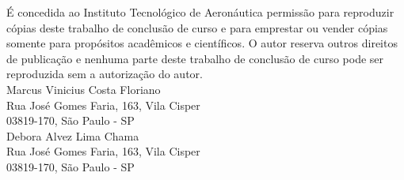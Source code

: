 \begin{titlepage}
\normalfont \normalsize É concedida ao Instituto Tecnológico de Aeronáutica permissão para reproduzir cópias deste trabalho de conclusão de curso e para emprestar ou vender cópias somente para propósitos acadêmicos e científicos. O autor reserva outros direitos de publicação e nenhuma parte deste trabalho de conclusão de curso pode ser reproduzida sem a autorização do autor.\\

Marcus Vinicius Costa Floriano\\
Rua José Gomes Faria, 163, Vila Cisper\\
03819-170, São Paulo - SP\\

Debora Alvez Lima Chama\\
Rua José Gomes Faria, 163, Vila Cisper\\
03819-170, São Paulo - SP\\

\end{titlepage}

